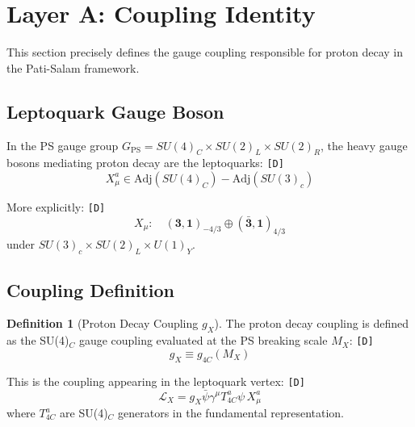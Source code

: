 \documentclass[11pt,a4paper]{article}
\newcommand{\tagD}{\textcolor{green!50!black}{\texttt{[D]}}}
\theoremstyle{definition}
\newtheorem{definition}{Definition}[section]
\begin{document}
\section{Layer A: Coupling Identity}
\label{sec:coupling-identity}

\begin{couplingbox}
This section precisely defines the gauge coupling responsible for proton decay
in the Pati-Salam framework.
\end{couplingbox}

\subsection{Leptoquark Gauge Boson}
\label{subsec:leptoquark-boson}

In the PS gauge group $G_{\text{PS}} = SU(4)_C \times SU(2)_L \times SU(2)_R$,
the heavy gauge bosons mediating proton decay are the leptoquarks: \tagD{}
\begin{equation}
\label{eq:leptoquark-def}
X_\mu^a \in \text{Adj}(SU(4)_C) - \text{Adj}(SU(3)_c)
\end{equation}

More explicitly: \tagD{}
\begin{equation}
\label{eq:leptoquark-rep}
X_\mu : \quad (\mathbf{3}, \mathbf{1})_{-4/3} \oplus (\bar{\mathbf{3}}, \mathbf{1})_{4/3}
\end{equation}
under $SU(3)_c \times SU(2)_L \times U(1)_Y$.

\subsection{Coupling Definition}
\label{subsec:coupling-def}

\begin{definition}[Proton Decay Coupling $g_X$]
\label{def:gx}
The proton decay coupling is defined as the SU(4)$_C$ gauge coupling evaluated
at the PS breaking scale $M_X$: \tagD{}
\begin{equation}
\label{eq:gx-definition}
\boxed{g_X \equiv g_{4C}(M_X)}
\end{equation}
\end{definition}

This is the coupling appearing in the leptoquark vertex: \tagD{}
\begin{equation}
\label{eq:leptoquark-vertex}
\mathcal{L}_{X} = g_X \bar{\psi} \gamma^\mu T^a_{4C} \psi \, X_\mu^a
\end{equation}
where $T^a_{4C}$ are SU(4)$_C$ generators in the fundamental representation.
\end{document}
